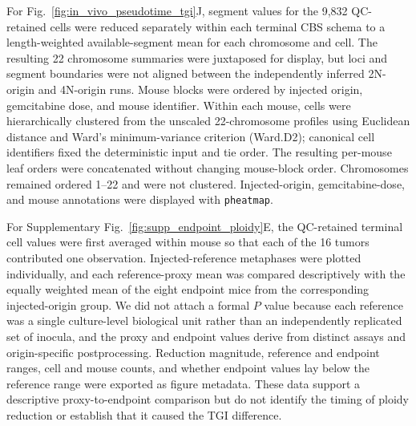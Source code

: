 \documentclass[11pt,notitlepage]{article}
\begin{document}
For Fig.~\ref{fig:in_vivo_pseudotime_tgi}J, segment values for the 9,832 QC-retained cells were reduced separately within each terminal CBS schema to a length-weighted available-segment mean for each chromosome and cell. The resulting 22 chromosome summaries were juxtaposed for display, but loci and segment boundaries were not aligned between the independently inferred 2N-origin and 4N-origin runs. Mouse blocks were ordered by injected origin, gemcitabine dose, and mouse identifier. Within each mouse, cells were hierarchically clustered from the unscaled 22-chromosome profiles using Euclidean distance and Ward's minimum-variance criterion (Ward.D2); canonical cell identifiers fixed the deterministic input and tie order. The resulting per-mouse leaf orders were concatenated without changing mouse-block order. Chromosomes remained ordered 1--22 and were not clustered. Injected-origin, gemcitabine-dose, and mouse annotations were displayed with \texttt{pheatmap}.

For Supplementary Fig.~\ref{fig:supp_endpoint_ploidy}E, the QC-retained terminal cell values were first averaged within mouse so that each of the 16 tumors contributed one observation. Injected-reference metaphases were plotted individually, and each reference-proxy mean was compared descriptively with the equally weighted mean of the eight endpoint mice from the corresponding injected-origin group. We did not attach a formal \(P\) value because each reference was a single culture-level biological unit rather than an independently replicated set of inocula, and the proxy and endpoint values derive from distinct assays and origin-specific postprocessing. Reduction magnitude, reference and endpoint ranges, cell and mouse counts, and whether endpoint values lay below the reference range were exported as figure metadata. These data support a descriptive proxy-to-endpoint comparison but do not identify the timing of ploidy reduction or establish that it caused the TGI difference.
\end{document}
